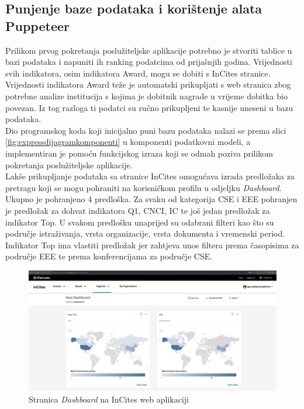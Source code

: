 \documentclass[times, utf8, zavrsni]{fer}
\begin{document}
\subsection{Punjenje baze podataka i korištenje alata\\ Puppeteer}
Prilikom prvog pokretanja poslužiteljske aplikacije potrebno je stvoriti tablice u bazi podataka i napuniti ih ranking podatcima od prijašnjih godina.
Vrijednosti svih indikatora, osim indikatora Award, mogu se dobiti s InCites stranice. Vrijednosti indikatora Award teže je automatski prikupljati 
s web stranica zbog potrebne analize institucija s kojima je dobitnik nagrade u vrijeme dobitka bio povezan. Iz tog razloga ti podatci 
su ručno prikupljeni te kasnije uneseni u bazu podataka. 
\\Dio programskog koda koji inicijalno puni bazu podataka nalazi se prema slici \ref{fig:expressdijagramkomponenti} u komponenti podatkovni modeli, a 
implementiran je pomoću funkcijskog izraza koji se odmah poziva  prilikom pokretanja 
poslužiteljske aplikacije. \\Lakše prikupljanje podataka sa stranice InCites omogućava izrada predložaka za pretragu koji se mogu pohraniti 
na korisničkom profilu u odjeljku \emph{Dashboard}. Ukupno je pohranjeno 4 predloška. Za svaku od kategorija CSE i EEE pohranjen je predložak 
za dohvat indikatora Q1, CNCI, IC te još jedan predložak za indikator Top. U svakom predlošku unaprijed su odabrani filteri kao što su područje istraživanja,
vrsta organizacije, vrsta dokumenta i vremenski period. Indikator Top ima vlastiti predložak jer zahtjeva unos filtera prema časopisima za područje EEE te 
prema konferencijama za područje CSE. 
\begin{figure}[htb]
    \hspace*{-2cm} 
       \includegraphics[scale=0.21]{dashboard.png} 
       \caption{Stranica \emph{Dashboard} na InCites web aplikaciji}
       \label{fig:dashboard}
       \end{figure} 
\end{document}
